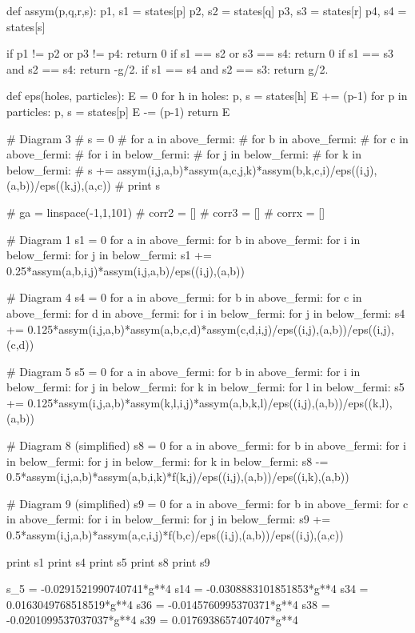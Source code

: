 \documentclass[%
twoside,                 %
final,                   %
10pt]{article}
\newenvironment{doconceexercise}{}{}
\begin{document}
\begin{doconceexercise}
def assym(p,q,r,s):
	p1, s1 = states[p]
	p2, s2 = states[q]
	p3, s3 = states[r]
	p4, s4 = states[s]

	if p1 != p2 or p3 != p4:
		return 0
	if s1 == s2 or s3 == s4:
		return 0
	if s1 == s3 and s2 == s4:
		return -g/2.
	if s1 == s4 and s2 == s3:
		return g/2.

def eps(holes, particles):
	E = 0
	for h in holes:
		p, s = states[h]
		E += (p-1)
	for p in particles:
		p, s = states[p]
		E -= (p-1)
	return E


# Diagram 3
# s = 0 
# for a in above_fermi:
# 	for b in above_fermi:
# 		for c in above_fermi:
# 			for i in below_fermi:
# 				for j in below_fermi:
# 					for k in below_fermi:
# 						s += assym(i,j,a,b)*assym(a,c,j,k)*assym(b,k,c,i)/eps((i,j),(a,b))/eps((k,j),(a,c))
# print s


# ga = linspace(-1,1,101)
# corr2 = []
# corr3 = []
# corrx = []


# Diagram 1
s1 = 0
for a in above_fermi:
	for b in above_fermi:
		for i in below_fermi:
			for j in below_fermi:
				s1 += 0.25*assym(a,b,i,j)*assym(i,j,a,b)/eps((i,j),(a,b))

# Diagram 4
s4 = 0
for a in above_fermi:
	for b in above_fermi:
		for c in above_fermi:
			for d in above_fermi:
				for i in below_fermi:
					for j in below_fermi:
						s4 += 0.125*assym(i,j,a,b)*assym(a,b,c,d)*assym(c,d,i,j)/eps((i,j),(a,b))/eps((i,j),(c,d))

# Diagram 5
s5 = 0
for a in above_fermi:
	for b in above_fermi:
		for i in below_fermi:
			for j in below_fermi:
				for k in below_fermi:
					for l in below_fermi:
						s5 += 0.125*assym(i,j,a,b)*assym(k,l,i,j)*assym(a,b,k,l)/eps((i,j),(a,b))/eps((k,l),(a,b))

# Diagram 8 (simplified)
s8 = 0 
for a in above_fermi:
	for b in above_fermi:
		for i in below_fermi:
			for j in below_fermi:
				for k in below_fermi:
					s8 -= 0.5*assym(i,j,a,b)*assym(a,b,i,k)*f(k,j)/eps((i,j),(a,b))/eps((i,k),(a,b))

# Diagram 9 (simplified)
s9 = 0 
for a in above_fermi:
	for b in above_fermi:
		for c in above_fermi:
			for i in below_fermi:
				for j in below_fermi:
					s9 += 0.5*assym(i,j,a,b)*assym(a,c,i,j)*f(b,c)/eps((i,j),(a,b))/eps((i,j),(a,c))


print s1
print s4
print s5
print s8
print s9

s_5 =  -0.0291521990740741*g**4
s14 =  -0.0308883101851853*g**4
s34 =  0.0163049768518519*g**4
s36 =  -0.0145760995370371*g**4
s38 =  -0.0201099537037037*g**4
s39 =  0.0176938657407407*g**4


\end{doconceexercise}
\end{document}
